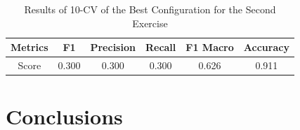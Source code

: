 \documentclass[12pt, onecolumn]{article}
\begin{document}
\begin{table}[!h]
  \centering
  \begin{tabular}{ |c|c|c|c|c|c| } 
    \hline
    Metrics& F1 & Precision & Recall & F1 Macro & Accuracy\\
    \hline
    Score& 0.300 & 0.300 & 0.300 & 0.626 & 0.911\\
    \hline
  \end{tabular}
  \caption{Results of 10-CV of the Best Configuration for the Second Exercise}
  \label{tab:best_2}
\end{table}

\section*{Conclusions}
\end{document}
